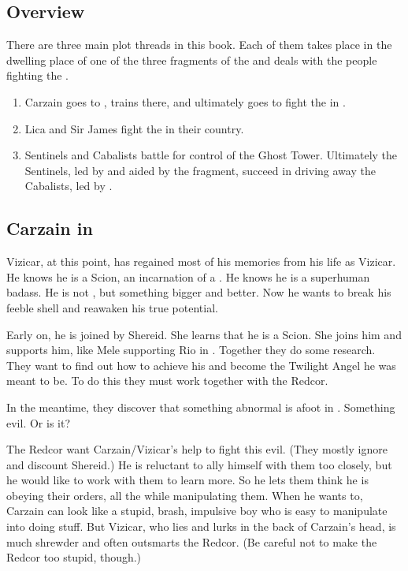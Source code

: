 \begin{garbage}
\section{Overview}
There are three main plot threads in this book. 
Each of them takes place in the dwelling place of one of the three fragments of the \Haskelek{} and deals with the people fighting the \Haskelek. 

\begin{enumerate}
  \item 
    Carzain goes to \Redce{}, trains there, and ultimately goes to fight the \Haskelek{} in \Redce.
  \item
    Lica and Sir James fight the \Haskelek{} in their country.
  \item
    Sentinels and Cabalists battle for control of the Ghost Tower. 
    Ultimately the Sentinels, led by \Nzessuacrith{} and aided by the \Haskelek{} fragment, succeed in driving away the Cabalists, led by \Achsah. 
\end{enumerate}









\subsection{Carzain in \Redce}
Vizicar, at this point, has regained most of his memories from his life as Vizicar. 
He knows he is a Scion, an incarnation of a \malach. 
He knows he is a superhuman badass. 
He is not \human, but something bigger and better. 
Now he wants to break his feeble \human{} shell and reawaken his true potential. 

Early on, he is joined by Shereid. 
She learns that he is a Scion. 
She joins him and supports him, like Mele supporting Rio in \cite{Tokusatsu:Gekiranger}. 
Together they do some research. 
They want to find out how to achieve his \Apotheosis{} and become the Twilight Angel he was meant to be. 
To do this they must work together with the Redcor. 

In the meantime, they discover that something abnormal is afoot in \Redce.
Something evil. 
Or is it? 

The Redcor want Carzain/Vizicar's help to fight this evil. 
(They mostly ignore and discount Shereid.) 
He is reluctant to ally himself with them too closely, but he would like to work with them to learn more. 
So he lets them think he is obeying their orders, all the while manipulating them. 
When he wants to, Carzain can look like a stupid, brash, impulsive boy who is easy to manipulate into doing stuff. 
But Vizicar, who lies and lurks in the back of Carzain's head, is much shrewder and often outsmarts the Redcor. 
(Be careful not to make the Redcor too stupid, though.)










\end{garbage}
